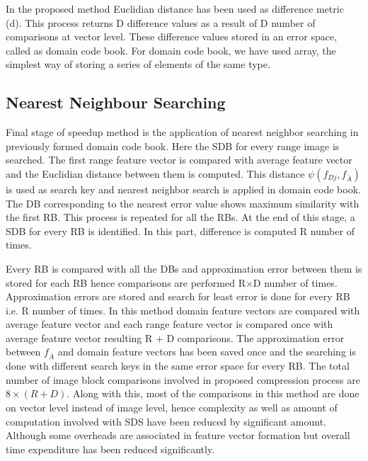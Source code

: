\documentclass[10pt,a4paper,journal]{IEEEtran}
\begin{document}
\hspace*{2em} In the proposed method Euclidian distance  has been used as difference metric (d). This process returns D difference values
as a result of D number of comparisons at vector level. These difference
values stored in an error space, called as domain code book. For domain code book, we have used array, the simplest way of storing a series of elements of the same type.


\subsection{Nearest Neighbour Searching}
\hspace*{2em} Final stage of speedup method is the application of nearest neighbor searching\cite{15} in previously formed domain code
book. Here the SDB for every range image is searched. The first
range feature vector is compared with average feature vector and
the Euclidian distance between them is computed.
\hspace*{2em} This distance $\psi(f_{Dj},f_{\bar{A}})$  is used as search key and nearest neighbor
search is applied in domain code book. The DB corresponding to the nearest error value shows maximum similarity with the first RB. This process is repeated for all the RBs. At the end of
this stage, a SDB for every RB is identified. In this part, difference is computed R number of times.

 Every RB is compared with all the DBs and approximation error between them is stored for each RB hence comparisons are performed R$\times$D number of times.
 \hspace*{2em} Approximation errors are stored and search for least error is done for every RB i.e. R
number of times. In this method domain feature
vectors are compared with average feature vector and each range feature vector is compared once with average feature vector resulting R + D comparisons. The approximation error between $f_{\bar{A}}$ and domain feature vectors has been saved once and the searching is done with different search keys in the same error space for every RB. The total number of image block comparisons involved in proposed
compression process are $8 \times (R + D)$. Along with this, most of the comparisons in this method are done on vector level
instead of image level, hence complexity as well as amount of computation
involved with SDS have been reduced by significant
amount. Although some overheads are associated in feature vector
formation but overall time expenditure has been reduced
significantly.
\end{document}
